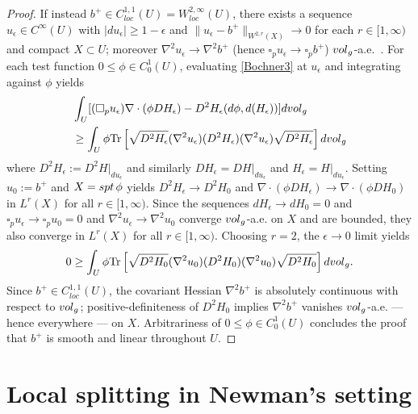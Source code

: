 \documentclass[12pt]{amsart}
\newcommand{\ep}{{\epsilon}}
\newcommand{\spt}{\mathop{\rm spt}}
\newcommand{\vol}{{\rm vol}}
\newcommand{\vg}{\vol_g}
\begin{document}
\begin{proof}
If instead $b^+ \in C^{1,1}_{loc}(U)=W^{2,\infty}_{loc}(U)$,  there exists a 
sequence $u_\ep \in C^\infty(U)$ with $|du_\ep| \ge 1-\ep$ and $\|u_\ep-b^+\|_{W^{2,r}(X)} \to 0$ for each $r\in[1,\infty)$ and compact $X \subset U$;  moreover $\nabla^2 u_\ep \to \nabla^2 b^+$ (hence
$\square_p u_\ep \to \square_p b^+$) 
$\vg$-a.e.\ \cite[\S 5.3.1 and C.4]{Evans98}.
For each test function $0 \le \phi \in C^1_0(U)$,  
evaluating \eqref{Bochner3}
at $u_\ep$ and integrating against $\phi$
yields
\begin{align*}
&\int_U [ (\square_p u_\ep)\nabla \cdot (\phi DH_\ep)
- D^2 H_\ep (d\phi,d(H_\ep)) ] d\vg
\\ &\ge 
\int_U \phi \mathrm{Tr}\left[ \sqrt{D^2H_\ep} (\nabla^2 u_\ep) (D^2 H_\ep) (\nabla^2 u_\ep) \sqrt{D^2H_\ep}\right] d\vg
\end{align*}
where $D^2H_\ep:=D^2 H|_{du_\ep}$ and similarly $DH_\ep= DH|_{du_\ep}$ and $H_\ep=H|_{du_\ep}$.
Setting $u_0 := b^+$ and $X =\spt \phi$ yields
$D^2 H_\ep \to D^2 H_0$ and $\nabla \cdot (\phi DH_\epsilon) \to \nabla \cdot (\phi DH_0)$ in $L^{r}(X)$ 
for all $r \in [1,\infty)$.  
Since the sequences
$d H_\ep \to d H_0=0$ and $\square_p u_\ep \to \square_p u_0=0$
and $\nabla^2 u_\ep \to \nabla^2 u_0$ converge
$\vg$-a.e. on $X$ and are bounded, they also converge in $L^r(X)$
for all $r \in [1,\infty)$. Choosing $r=2$,
the $\ep \to 0$ limit yields
\begin{align*}
0 \ge 
\int_U \phi \mathrm{Tr}\left[ \sqrt{D^2H_0} (\nabla^2 u_0) (D^2 H_0) (\nabla^2 u_0) \sqrt{D^2H_0}\right] d\vg.
\end{align*}
Since $b^+ \in C^{1,1}_{loc}(U)$,  the covariant Hessian 
$\nabla^2 b^+$ is absolutely continuous with respect to $\vg$;
positive-definiteness of $D^2H_0$ implies $\nabla^2 b^+$ vanishes $\vg$-a.e. --- hence everywhere --- on $X$.  
Arbitrariness of 
$0 \le \phi \in C^1_0(U)$ concludes the proof that $b^+$
is smooth and linear throughout $U$.
\end{proof}

\section{Local splitting in Newman's setting}
\end{document}
